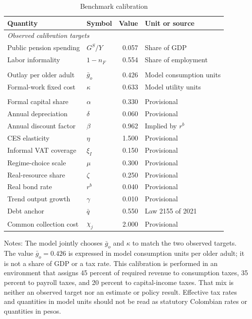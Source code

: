 \documentclass[12pt]{article}
\begin{document}
\begin{table}[H]
\centering
\caption{Benchmark calibration}
\label{tab:calibration}
\begin{threeparttable}
\begin{tabular}{llrl}
\toprule
Quantity & Symbol & Value & Unit or source \\
\midrule
\multicolumn{4}{l}{\textit{Observed calibration targets}} \\
Public pension spending & $G^S/Y$ & 0.057 & Share of GDP \\
Labor informality & $1-n_F$ & 0.554 & Share of employment \\
\addlinespace
\multicolumn{4}{l}{\textit{Parameters calibrated to the observed targets}} \\
Outlay per older adult & $\bar g_o$ & 0.426 & Model consumption units \\
Formal-work fixed cost & $\kappa$ & 0.633 & Model utility units \\
\addlinespace
\multicolumn{4}{l}{\textit{Benchmark inputs and provisional assumptions}} \\
Formal capital share & $\alpha$ & 0.330 & Provisional \\
Annual depreciation & $\delta$ & 0.060 & Provisional \\
Annual discount factor & $\beta$ & 0.962 & Implied by $r^b$ \\
CES elasticity & $\eta$ & 1.500 & Provisional \\
Informal VAT coverage & $\xi_I$ & 0.150 & Provisional \\
Regime-choice scale & $\mu$ & 0.300 & Provisional \\
Real-resource share & $\zeta$ & 0.250 & Provisional \\
Real bond rate & $r^b$ & 0.040 & Provisional \\
Trend output growth & $\gamma$ & 0.010 & Provisional \\
Debt anchor & $\bar q$ & 0.550 & Law 2155 of 2021 \\
Common collection cost & $\chi_j$ & 2.000 & Provisional \\
\bottomrule
\end{tabular}
\begin{tablenotes}\footnotesize
\item Notes: The model jointly chooses $\bar g_o$ and $\kappa$ to match the two
observed targets. The value $\bar g_o=0.426$ is expressed in model consumption
units per older adult; it is not a share of GDP or a tax rate. This calibration
is performed in an environment that assigns 45 percent of required revenue to
consumption taxes, 35 percent to payroll taxes, and 20 percent to capital-income
taxes. That mix is neither an observed target nor an estimate or policy result.
Effective tax rates and quantities in model units should not be read as
statutory Colombian rates or quantities in pesos.
\end{tablenotes}
\end{threeparttable}
\end{table}
\end{document}
